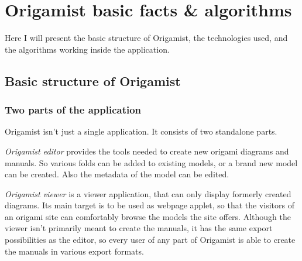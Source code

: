 \chapter{Origamist basic facts \& algorithms}

Here I will present the basic structure of Origamist, the technologies used, and the algorithms working inside the application.

\section{Basic structure of Origamist}

\subsection{Two parts of the application}
Origamist isn't just a single application. It consists of two standalone parts. 

\emph{Origamist editor} provides the tools needed to create new origami diagrams and manuals. So various folds can be added to existing models, or a brand new model can be created. Also the metadata of the model can be edited.

\emph{Origamist viewer} is a viewer application, that can only display formerly created diagrams. Its main target is to be used as webpage applet, so that the visitors of an origami site can comfortably browse the models the site offers. Although the viewer isn't primarily meant to create the manuals, it has the same export possibilities as the editor, so every user of any part of Origamist is able to create the manuals in various export formats.
